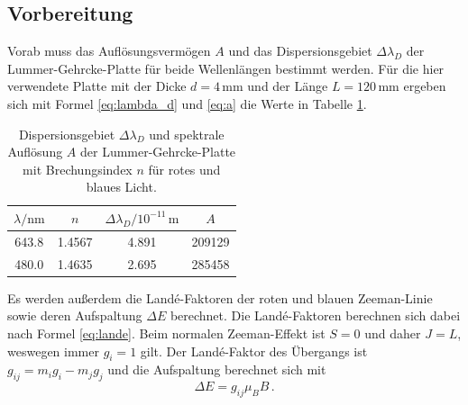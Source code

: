 \subsection{Vorbereitung}
Vorab muss das Auflösungsvermögen $A$ und das Dispersionsgebiet $\Delta \lambda_D$ der Lummer-Gehrcke-Platte 
für beide Wellenlängen bestimmt werden. Für die hier verwendete Platte mit der Dicke $d = 4 \, \si{\milli\meter}$ und 
der Länge $L = 120 \, \si{\milli\meter}$ ergeben sich mit Formel \eqref{eq:lambda_d} und \eqref{eq:a} die Werte in Tabelle \ref{tab:atab0}.
\FloatBarrier
\begin{table}[h]
    \centering
    \caption{Dispersionsgebiet $\Delta \lambda_D$ und spektrale Auflösung $A$ der Lummer-Gehrcke-Platte mit Brechungsindex $n$ für rotes und blaues Licht.}
    \label{tab:atab0}
    \begin{tabular}{c c c c}
        \toprule
        {$\lambda / \si{\nano\meter}$} & {$n$} & {$\Delta \lambda_D / 10^{-11}\, \si{\meter}$} & {$A$}\\
        \midrule
        643.8 & 1.4567 & 4.891 & 209129 \\
        480.0 & 1.4635 & 2.695 & 285458 \\
        \bottomrule
    \end{tabular}
\end{table}
\FloatBarrier
\noindent
Es werden außerdem die Landé-Faktoren der roten und blauen Zeeman-Linie sowie deren Aufspaltung $\Delta E$ berechnet.
Die Landé-Faktoren berechnen sich dabei nach Formel \eqref{eq:lande}. Beim normalen Zeeman-Effekt ist $S = 0$ und daher
$J = L$, weswegen immer $g_i = 1$ gilt. Der Landé-Faktor des Übergangs ist $g_{ij} = m_i g_i - m_j g_j$ und die Aufspaltung
berechnet sich mit
\begin{equation}
    \label{eq:afrika}
    \Delta E = g_{ij} \mu_B B \, .
\end{equation}
\FloatBarrier
